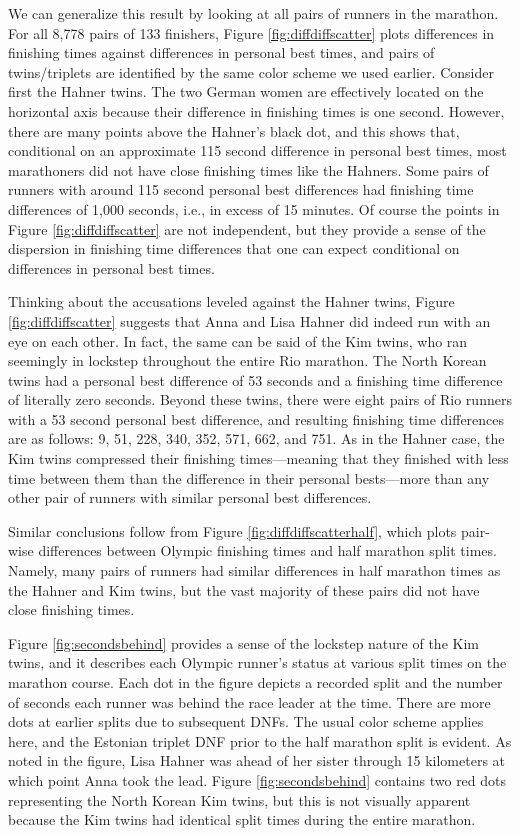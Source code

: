 \documentclass[12pt,titlepage]{article}
\begin{document}
We can generalize this result by looking at all pairs of runners in
the marathon.  For all 8,778 pairs of 133 finishers, Figure
\ref{fig:diffdiffscatter} plots differences in finishing times against
differences in personal best times, and pairs of twins/triplets are
identified by the same color scheme we used earlier.  Consider first
the Hahner twins.  The two German women are effectively located on the
horizontal axis because their difference in finishing times is one
second.  However, there are many points above the Hahner's black dot,
and this shows that, conditional on an approximate 115 second
difference in personal best times, most marathoners did not have close
finishing times like the Hahners.  Some pairs of runners with around
115 second personal best differences had finishing time differences of
1,000 seconds, i.e., in excess of 15 minutes.  Of course the points in
Figure \ref{fig:diffdiffscatter} are not independent, but they provide
a sense of the dispersion in finishing time differences that one can
expect conditional on differences in personal best times.

Thinking about the accusations leveled against the Hahner twins,
Figure \ref{fig:diffdiffscatter} suggests that Anna and Lisa Hahner
did indeed run with an eye on each other.  In fact, the same can be
said of the Kim twins, who ran seemingly in lockstep throughout the
entire Rio marathon.  The North Korean twins had a personal best
difference of 53 seconds and a finishing time difference of literally
zero seconds.  Beyond these twins, there were eight pairs of Rio
runners with a 53 second personal best difference, and resulting
finishing time differences are as follows: 9, 51, 228, 340, 352, 571,
662, and 751.  As in the Hahner case, the Kim twins compressed their
finishing times---meaning that they finished with less time between
them than the difference in their personal bests---more than any other
pair of runners with similar personal best differences.

Similar conclusions follow from Figure \ref{fig:diffdiffscatterhalf},
which plots pair-wise differences between Olympic finishing times and
half marathon split times.  Namely, many pairs of runners had similar
differences in half marathon times as the Hahner and Kim twins, but
the vast majority of these pairs did not have close finishing times.

Figure \ref{fig:secondsbehind} provides a sense of the lockstep nature
of the Kim twins, and it describes each Olympic runner's status at
various split times on the marathon course.  Each dot in the figure
depicts a recorded split and the number of seconds each runner was
behind the race leader at the time.  There are more dots at earlier
splits due to subsequent DNFs.  The usual color scheme applies here,
and the Estonian triplet DNF prior to the half marathon split is
evident. As noted in the figure, Lisa Hahner was ahead of her sister
through 15 kilometers at which point Anna took the lead.  Figure
\ref{fig:secondsbehind} contains two red dots representing the North
Korean Kim twins, but this is not visually apparent because the Kim
twins had identical split times during the entire marathon.
\end{document}
